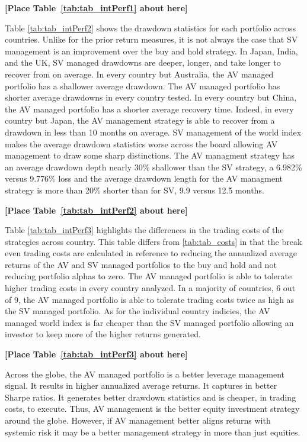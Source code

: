 \bigskip
\centerline{\bf [Place Table~\ref{tab:tab_intPerf1} about here]}
\bigskip

Table \ref{tab:tab_intPerf2} shows the drawdown statistics for each portfolio across countries. Unlike for the prior return measures, it is not always the case that SV management is an improvement over the buy and hold strategy. In Japan, India, and the UK, SV managed drawdowns are deeper, longer, and take longer to recover from on average. In every country but Australia, the AV managed portfolio has a shallower average drawdown. The AV managed portfolio has shorter average drawdowns in every country tested. In every country but China, the AV managed portfolio has a shorter average recovery time. Indeed, in every country but Japan, the AV management strategy is able to recover from a drawdown in less than 10 months on average. SV management of the world index makes the average drawdown statistics worse across the board allowing AV management to draw some sharp distinctions. The AV managment strategy has an average drawdown depth nearly 30\% shallower than the SV strategy, a 6.982\% versus 9.776\% loss and the average drawdown length for the AV managment strategy is more than 20\% shorter than for SV, 9.9 versus 12.5 months.

\bigskip
\centerline{\bf [Place Table~\ref{tab:tab_intPerf2} about here]}
\bigskip

Table \ref{tab:tab_intPerf3} highlights the differences in the trading costs of the strategies across country. This table differs from \ref{tab:tab_costs} in that the break even trading costs are calculated in reference to reducing the annualized average returns of the AV and SV managed portfolios to the buy and hold and not reducing portfolio alphas to zero. The AV managed portfolio is able to tolerate higher trading costs in every country analyzed. In a majority of countries, 6 out of 9, the AV managed portfolio is able to tolerate trading costs twice as high as the SV managed portfolio. As for the individual country indicies, the AV managed world index is far cheaper than the SV managed portfolio allowing an investor to keep more of the higher returns generated.

\bigskip
\centerline{\bf [Place Table~\ref{tab:tab_intPerf3} about here]}
\bigskip

Across the globe, the AV managed portfolio is a better leverage management signal. It results in higher annualized average returns. It captures in better Sharpe ratios. It generates better drawdown statistics and is cheaper, in trading costs, to execute. Thus, AV management is the better equity investment strategy around the globe. However, if AV management better aligns returns with systemic risk it may be a better management strategy in more than just equities.